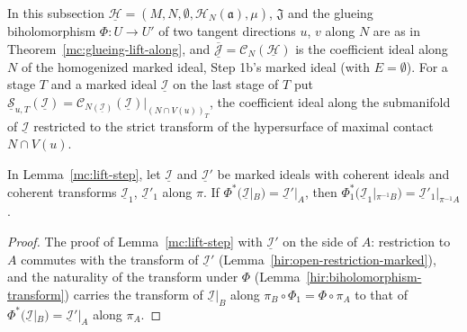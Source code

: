 In this subsection \(\underline{\mathcal H}=(M,N,\emptyset,\mathcal H_N(\mathfrak a),\mu)\), \(\mathfrak J\) and the glueing biholomorphism \(\Phi\colon U\to U'\) of two tangent
directions \(u\), \(v\) along \(N\) are as in Theorem~\ref{mc:glueing-lift-along}, and \(\overline{\underline{\mathcal J}}=\mathcal C_N(\underline{\mathcal H})\) is the coefficient
ideal along \(N\) of the homogenized marked ideal, Step 1b's marked ideal (with \(E=\emptyset\)). For a stage \(T\) and a marked ideal \(\underline{\mathcal I}\) on the last
stage of \(T\) put \(\underline{\mathcal S}_{u,T}(\underline{\mathcal I})=\mathcal C_{N(\underline{\mathcal I})}(\underline{\mathcal I})|_{(N\cap V(u))_T}\), the coefficient ideal along the
submanifold of \(\underline{\mathcal I}\) restricted to the strict transform of the hypersurface of maximal contact \(N\cap V(u)\).

\begin{lemma}
\label{mc:lift-step-pair}
\leanok
In Lemma~\ref{mc:lift-step}, let \(\underline{\mathcal I}\) and \(\underline{\mathcal I}'\) be marked ideals with coherent ideals and coherent transforms
\(\underline{\mathcal I}_1\), \(\underline{\mathcal I}'_1\) along \(\pi\). If \(\Phi^*(\underline{\mathcal I}|_B)=\underline{\mathcal I}'|_A\), then
\(\Phi_1^*(\underline{\mathcal I}_1|_{\pi^{-1}B})=\underline{\mathcal I}'_1|_{\pi^{-1}A}\).
\end{lemma}
\begin{proof}
\leanok
The proof of Lemma~\ref{mc:lift-step} with \(\underline{\mathcal I}'\) on the side of \(A\): restriction to \(A\) commutes with the transform of \(\underline{\mathcal I}'\)
(Lemma~\ref{hir:open-restriction-marked}), and the naturality of the transform under \(\Phi\) (Lemma~\ref{hir:biholomorphism-transform}) carries the transform of
\(\underline{\mathcal I}|_B\) along \(\pi_B\circ\Phi_1=\Phi\circ\pi_A\) to that of \(\Phi^*(\underline{\mathcal I}|_B)=\underline{\mathcal I}'|_A\) along \(\pi_A\).
\end{proof}

